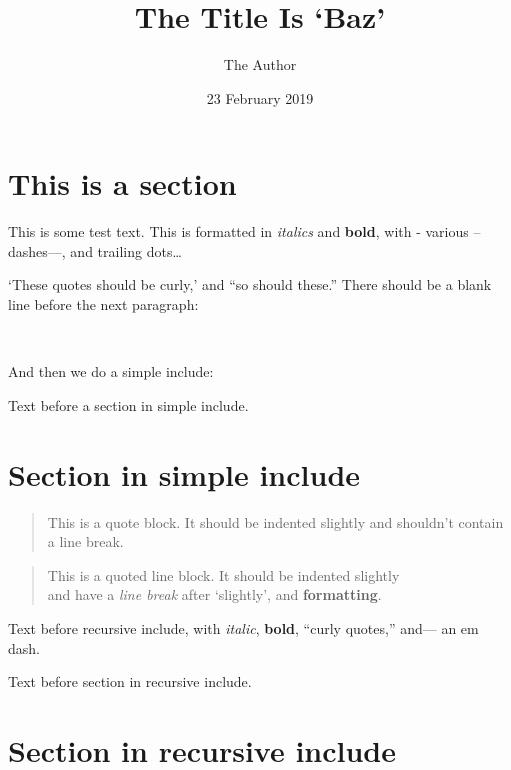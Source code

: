 \documentclass[
  12pt,
  british,
  a4paper,
]{article}
\title{The Title Is `Baz'}
\author{The Author}
\date{23 February 2019}
\begin{document}
\maketitle

\frenchspacing

{
\hypersetup{linkcolor=}
\setcounter{tocdepth}{1}
\tableofcontents
}


\hypertarget{this-is-a-section}{%
\section{This is a section}\label{this-is-a-section}}

This is some test text. This is formatted in \emph{italics} and
\textbf{bold}, with - various -- dashes---, and trailing dots\ldots{}

`These quotes should be curly,' and ``so should these.'' There should be
a blank line before the next paragraph:

~

And then we do a simple include:

Text before a section in simple include.

\hypertarget{section-in-simple-include}{%
\section{Section in simple include}\label{section-in-simple-include}}

\begin{quote}
This is a quote block. It should be indented slightly and shouldn't
contain a line break.
\end{quote}

\begin{quote}
This is a quoted line block. It should be indented slightly\\
and have a \emph{line break} after `slightly', and \textbf{formatting}.
\end{quote}

Text before recursive include, with \emph{italic}, \textbf{bold},
``curly quotes,'' and--- an em dash.

Text before section in recursive include.

\hypertarget{section-in-recursive-include}{%
\section{Section in recursive
include}\label{section-in-recursive-include}}
\end{document}
